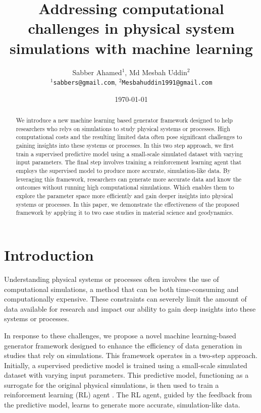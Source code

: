 \documentclass{article}
\title{Addressing computational challenges in physical system simulations with machine learning}
\author{
    Sabber Ahamed$^1$, Md Mesbah Uddin$^2$ \\
    \texttt{$^1$sabbers@gmail.com}, \texttt{$^2$Mesbahuddin1991@gmail.com} \\
}
\date{\today}
\begin{document}
\maketitle

\begin{abstract}
    \noindent We introduce a new machine learning based generator framework designed to help researchers who relys on simulations to study physical systems or processes. High computational costs and the resulting limited data often pose significant challenges to gaining insights into these systems or processes. In this two step approach, we first train a supervised predictive model using a small-scale simulated dataset with varying input parameters. The final step involves training a reinforcement learning agent that employs the supervised model to produce more accurate, simulation-like data. By leveraging this framework, researchers can generate more accurate data and know the outcomes without running high computational simulations. Which enables them to explore the parameter space more efficiently and gain deeper insights into physical systems or processes. In this paper, we demonstrate the effectiveness of the proposed framework by applying it to two case studies in material science and geodynamics.
\end{abstract}

\maketitle

\section{Introduction}

Understanding physical systems or processes often involves the use of computational simulations, a method that can be both time-consuming and computationally expensive. These constraints can severely limit the amount of data available for research and impact our ability to gain deep insights into these systems or processes.

In response to these challenges, we propose a novel machine learning-based generator framework designed to enhance the efficiency of data generation in studies that rely on simulations. This framework operates in a two-step approach. Initially, a supervised predictive model is trained using a small-scale simulated dataset with varying input parameters. This predictive model, functioning as a surrogate for the original physical simulations, is then used to train a reinforcement learning (RL) agent \cite{sutton2018reinforcement}. The RL agent, guided by the feedback from the predictive model, learns to generate more accurate, simulation-like data.
\end{document}
